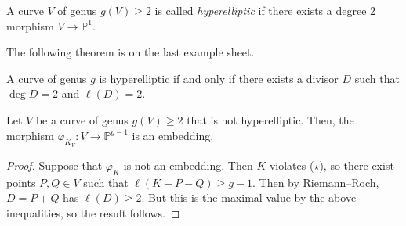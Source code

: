 \begin{definition}
    A curve \( V \) of genus \( g(V) \geq 2 \) is called \emph{hyperelliptic} if there exists a degree 2 morphism \( V \to \mathbb P^1 \).
\end{definition}
The following theorem is on the last example sheet.
\begin{theorem}
    A curve of genus \( g \) is hyperelliptic if and only if there exists a divisor \( D \) such that \( \deg D = 2 \) and \( \ell(D) = 2 \).
\end{theorem}
\begin{theorem}
    Let \( V \) be a curve of genus \( g(V) \geq 2 \) that is not hyperelliptic.
    Then, the morphism \( \varphi_{K_V} \colon V \to \mathbb P^{g-1} \) is an embedding.
\end{theorem}
\begin{proof}
    Suppose that \( \varphi_K \) is not an embedding.
    Then \( K \) violates (\( \star \)), so there exist points \( P, Q \in V \) such that \( \ell(K - P - Q) \geq g - 1 \).
    Then by Riemann--Roch, \( D = P + Q \) has \( \ell(D) \geq 2 \).
    But this is the maximal value by the above inequalities, so the result follows.
\end{proof}
